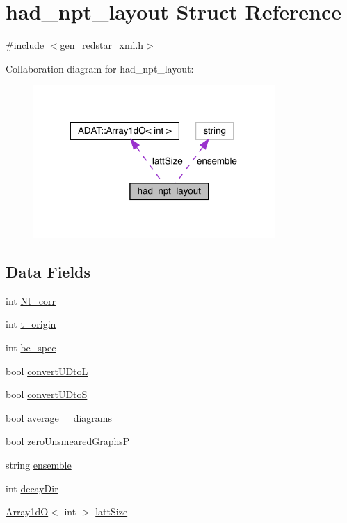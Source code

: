 \hypertarget{structhad__npt__layout}{}\section{had\+\_\+npt\+\_\+layout Struct Reference}
\label{structhad__npt__layout}


{\ttfamily \#include $<$gen\+\_\+redstar\+\_\+xml.\+h$>$}



Collaboration diagram for had\+\_\+npt\+\_\+layout\+:\nopagebreak
\begin{figure}[H]
\begin{center}
\leavevmode
\includegraphics[width=260pt]{db/d8f/structhad__npt__layout__coll__graph}
\end{center}
\end{figure}
\subsection*{Data Fields}
\begin{DoxyCompactItemize}
\item 
int \mbox{\hyperlink{structhad__npt__layout_abc09eb17e7cdfc526575b93d35daca78}{Nt\+\_\+corr}}
\item 
int \mbox{\hyperlink{structhad__npt__layout_a7f639cdba7cca4eb9daaa7bfdce0b572}{t\+\_\+origin}}
\item 
int \mbox{\hyperlink{structhad__npt__layout_aa7d31fa619f0cc55f7e079cb13738b77}{bc\+\_\+spec}}
\item 
bool \mbox{\hyperlink{structhad__npt__layout_a65f583e48cdd0e6f85756689d54a19f0}{convert\+U\+DtoL}}
\item 
bool \mbox{\hyperlink{structhad__npt__layout_a4a918cab0c3b066bdee7ff86347123fd}{convert\+U\+DtoS}}
\item 
bool \mbox{\hyperlink{structhad__npt__layout_aba65aeaba298dd1ee803b24cde744fbc}{average\+\_\+1pt\+\_\+diagrams}}
\item 
bool \mbox{\hyperlink{structhad__npt__layout_a7ff641e8e1a526af94a8a1cadcff2f55}{zero\+Unsmeared\+GraphsP}}
\item 
string \mbox{\hyperlink{structhad__npt__layout_a1b3625551970a5f08b99b26bbfb28c7c}{ensemble}}
\item 
int \mbox{\hyperlink{structhad__npt__layout_a9f7c12cdcdb130ab25bcda9ec07c9e65}{decay\+Dir}}
\item 
\mbox{\hyperlink{classADAT_1_1Array1dO}{Array1dO}}$<$ int $>$ \mbox{\hyperlink{structhad__npt__layout_a8aeb81484c80bc397d54e97e68f6abc7}{latt\+Size}}
\end{DoxyCompactItemize}


